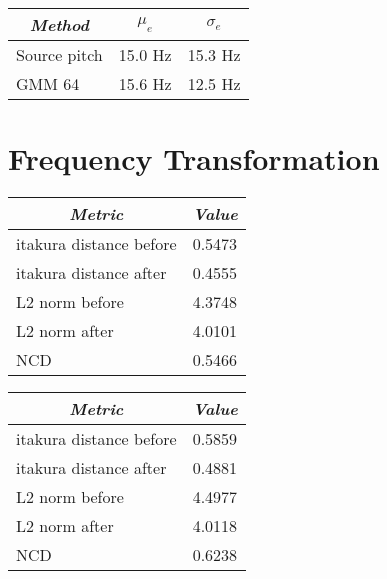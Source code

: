 \begin{table}[htbp]
	\begin{center}
		\begin{tabular}{lrr}
			\toprule
			\multicolumn{1}{c}{\emph{Method}} & \multicolumn{1}{c}{$\mu_e$} & \multicolumn{1}{c}{$\sigma_e$}\\
			\midrule
			Source pitch & 15.0 Hz & 15.3 Hz\\
			GMM 64 & 15.6 Hz  & 12.5 Hz \\
			\bottomrule			
		\end{tabular}		
	\end{center}
\label{tab:pitch_prediction_unvoiced}	
\end{table}

\section{Frequency Transformation} %
\label{sec:frequency_transformation}

\begin{table}[ht]
	\begin{center}
		\begin{tabular}{ll}
			\toprule
			\multicolumn{1}{c}{\emph{Metric}} & \multicolumn{1}{c}{\emph{Value}} \\
			\midrule
			itakura distance before & 0.5473 \\
			itakura distance after & 0.4555 \\
			L2 norm before & 4.3748\\
			L2 norm after & 4.0101 \\
			NCD & 0.5466 \\
			\bottomrule			
		\end{tabular}		
	\end{center}
\label{tab:frequency_transform_for_unvoiced_frames}	
\end{table}

\begin{table}[htbp]
	\begin{center}
		\begin{tabular}{ll}
			\toprule
			\multicolumn{1}{c}{\emph{Metric}} & \multicolumn{1}{c}{\emph{Value}} \\
			\midrule
			itakura distance before & 0.5859 \\
			itakura distance after & 0.4881 \\
			L2 norm before & 4.4977\\
			L2 norm after & 4.0118 \\
			NCD & 0.6238 \\
			\bottomrule			
		\end{tabular}		
	\end{center}
\label{tab:frequency_transform_for_unvoiced_frames2}	
\end{table}

